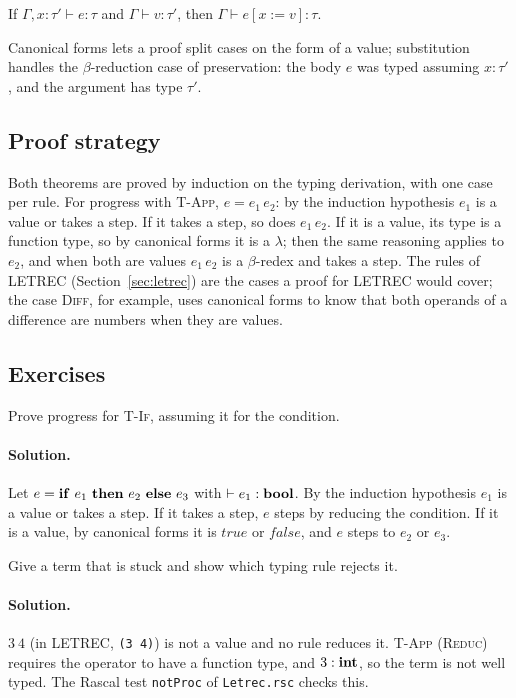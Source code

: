 \begin{lemma}[Substitution]
If $\Gamma, x : \tau' \vdash e : \tau$ and $\Gamma \vdash v : \tau'$, then
$\Gamma \vdash e[x := v] : \tau$.
\end{lemma}

Canonical forms lets a proof split cases on the form of a value; substitution
handles the $\beta$-reduction case of preservation: the body $e$ was typed
assuming $x : \tau'$, and the argument has type $\tau'$.

\subsection{Proof strategy}

Both theorems are proved by induction on the typing derivation, with one case
per rule. For progress with \textsc{T-App}, $e = e_1\, e_2$: by the induction
hypothesis $e_1$ is a value or takes a step. If it takes a step, so does
$e_1\, e_2$. If it is a value, its type is a function type, so by canonical
forms it is a $\lambda$; then the same reasoning applies to $e_2$, and when both are
values $e_1\, e_2$ is a $\beta$-redex and takes a step. The rules of LETREC
(Section~\ref{sec:letrec}) are the cases a proof for LETREC would cover; the
case \textsc{Diff}, for example, uses canonical forms to know that both
operands of a difference are numbers when they are values.

\subsection{Exercises}

\begin{exercise}
Prove progress for \textsc{T-If}, assuming it for the condition.
\end{exercise}

\paragraph{Solution.} Let $e = \mathbf{if}\ e_1\ \mathbf{then}\ e_2\ \mathbf{else}\ e_3$ with $\vdash e_1 : \mathbf{bool}$. By the
induction hypothesis $e_1$ is a value or takes a step. If it takes a step,
$e$ steps by reducing the condition. If it is a value, by canonical forms it
is $\mathit{true}$ or $\mathit{false}$, and $e$ steps to $e_2$ or $e_3$.

\begin{exercise}
Give a term that is stuck and show which typing rule rejects it.
\end{exercise}

\paragraph{Solution.} $3\ 4$ (in LETREC, \texttt{(3 4)}) is not a value and no rule
reduces it. \textsc{T-App} (\textsc{Reduc}) requires the operator to have a
function type, and $3 : \mathbf{int}$, so the term is not well typed. The Rascal test
\texttt{notProc} of \texttt{Letrec.rsc} checks this.
